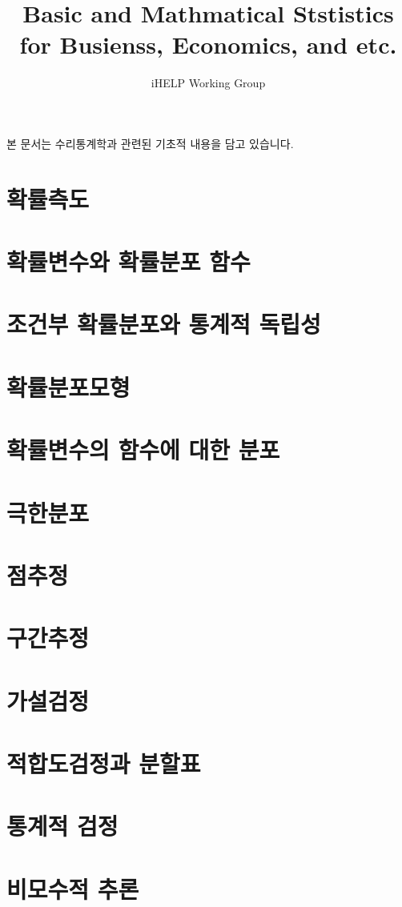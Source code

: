 \documentclass{article}
\begin{document}
\title{Basic and Mathmatical Ststistics for Busienss, Economics, and etc.}
\author{iHELP Working Group}

본 문서는 수리통계학과 관련된 기초적 내용을 담고 있습니다.

\chapter{확률측도}


\chapter{확률변수와 확률분포 함수}

\chapter{조건부 확률분포와 통계적 독립성}

\chapter{확률분포모형}

\chapter{확률변수의 함수에 대한 분포}

\chapter{극한분포}

\chapter{점추정}

\chapter{구간추정}

\chapter{가설검정}

\chapter{적합도검정과 분할표}

\chapter{통계적 검정}

\chapter{비모수적 추론}
\end{document}
